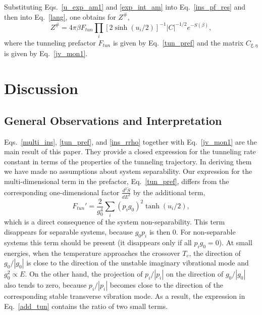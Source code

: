 \documentclass[journal=jpcafh,manuscript=article]{achemso}
\begin{document}
Substituting Eqs.~\ref{u_exp_am1} and \ref{exp_int_am} into
Eq.~\ref{ins_pf_res} and then into Eq.~\ref{lang}, one obtains for
$Z^\#$,
\begin{equation}
  \label{ins_rrho}
  Z^\#=4\pi{\beta}F_{tun}\prod_i[2\sinh(u_i/2)]^{-1}|C|^{-1/2}e^{-S(\beta)},
\end{equation}
where the tunneling prefactor $F_{tun}$ is given by Eq.~\ref{tun_pref}
and the matrix $C_{\xi,\eta}$ is given by Eq.~\ref{jv_mon1}.

\setcounter{equation}{0}
\section{Discussion}
\subsection{General Observations and Interpretation}
Eqs.~\ref{multi_ins}, \ref{tun_pref}, and \ref{ins_rrho} together with
Eq.~\ref{jv_mon1} are the main result of this paper. They provide a
closed expression for the tunneling rate constant in terms of the
properties of the tunneling trajectory.  In deriving them we have made
no assumptions about system separability.  Our expression for the
multi-dimensional term in the prefactor, Eq.~\ref{tun_pref}, differs
from the corresponding one-dimensional factor
$\frac{d^2\tilde{S}}{dE^2}$ by the additional term,
\begin{equation}
  \label{add_tun}
 F_{tun}'=\frac{2}{g_0^4}\sum_i (p_ig_0)^2\tanh(u_i/2),
\end{equation}
which is a direct consequence of the system non-separability.  This term
disappears for separable systems, because $g_0p_i$ is then $0$.  For
non-separable systems this term should be present (it disappears only
if all $p_ig_0=0$).  At small energies, when the temperature
approaches the crossover $T_c$, the direction of $g_0/|g_0|$ is close
to the direction of the unstable imaginary vibrational mode and
$g_0^2\propto E$. On the other hand, the projection of $p_i/|p_i|$ on
the direction of $g_0/|g_0|$ also tends to zero, because $p_i/|p_i|$
becomes close to the direction of the corresponding stable transverse
vibration mode. As a result, the expression in Eq.~\ref{add_tun}
contains the ratio of two small terms.
\end{document}

